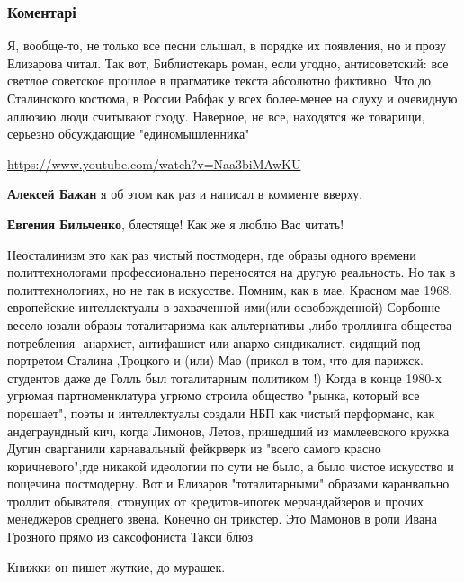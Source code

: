  
 
 
 
 
\subsubsection{Коментарі}
\label{sec:21_11_2021.fb.bilchenko_evgenia.2.chelovek_ne_sverh_ne_polu.cmt}

\begin{itemize} %

Я, вообще-то, не только все песни слышал, в порядке их появления, но и прозу
Елизарова читал. Так вот, Библиотекарь роман, если угодно, антисоветский: все
светлое советское прошлое в прагматике текста абсолютно фиктивно. Что до
Сталинского костюма, в России Рабфак у всех более-менее на слуху и очевидную
аллюзию люди считывают сходу. Наверное, не все, находятся же товарищи, серьезно
обсуждающие "единомышленника" 

\url{https://www.youtube.com/watch?v=Naa3biMAwKU}

\textbf{Алексей Бажан} я об этом как раз и написал в комменте вверху.

\textbf{Евгения Бильченко}, блестяще!
Как же я люблю Вас читать!


Неосталинизм это как раз чистый постмодерн, где образы одного времени
политтехнологами профессионально переносятся на другую реальность. Но так в
политтехнологиях, но не так в искусстве. Помним, как в мае, Красном мае 1968,
европейские интеллектуалы в захваченной ими(или освобожденной) Сорбонне весело
юзали образы тоталитаризма как альтернативы ,либо троллинга общества
потребления- анархист, антифашист или анархо синдикалист, сидящий под портретом
Сталина ,Троцкого и (или) Мао (прикол в том, что для парижск. студентов даже де
Голль был тоталитарным политиком !) Когда в конце 1980-х угрюмая
партноменклатура угрюмо строила общество "рынка, который все порешает", поэты и
интеллектуалы создали НБП как чистый перформанс, как андеграундный кич, когда
Лимонов, Летов, пришедший из мамлеевского кружка Дугин сварганили карнавальный
фейкрверк из "всего самого красно коричневого",где никакой идеологии по сути не
было, а было чистое искусство и пощечина постмодерну. Вот и Елизаров
"тоталитарными" образами каранвально троллит обывателя, стонущих от
кредитов-ипотек мерчандайзеров и прочих менеджеров среднего звена. Конечно он
трикстер. Это Мамонов в роли Ивана Грозного прямо из саксофониста Такси блюз

Книжки он пишет жуткие, до мурашек.

\end{itemize} %
